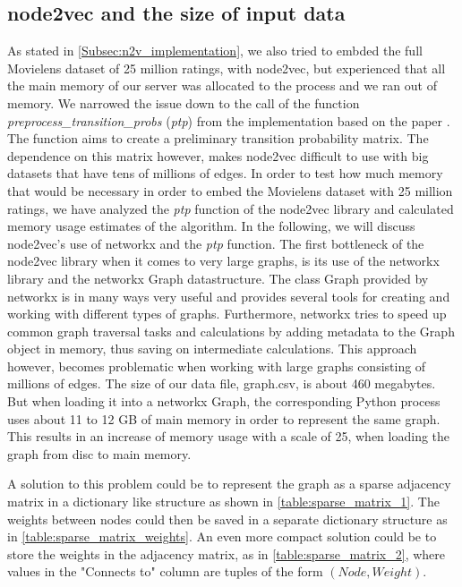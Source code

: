 \subsection{node2vec and the size of input data}\label{AP:N2V}

As stated in \autoref{Subsec:n2v_implementation}, we also tried to embded the full Movielens dataset of 25 million ratings, with node2vec, but experienced that all the main memory of our server was allocated to the process and we ran out of memory. We narrowed the issue down to the call of the function  \textit{preprocess\_transition\_probs} (\textit{ptp}) from the implementation based on the paper \cite{Node2vec}.
The function aims to create a preliminary transition probability matrix. The dependence on this matrix however, makes node2vec difficult to use with big datasets that have tens of millions of edges.
In order to test how much memory that would be necessary in order to embed the Movielens dataset with 25 million ratings, we have analyzed the \textit{ptp} function of the node2vec library and calculated memory usage estimates of the algorithm.
In the following, we will discuss node2vec's use of networkx and the \textit{ptp} function.
The first bottleneck of the node2vec library when it comes to very large graphs, is its use of the networkx library and the networkx Graph datastructure.
The class Graph provided by networkx is in many ways very useful and provides several tools for creating and working with different types of graphs. Furthermore, networkx tries to speed up common graph traversal tasks and calculations by adding metadata to the Graph object in memory, thus saving on intermediate calculations.
This approach however, becomes problematic when working with large graphs consisting of millions of edges.
The size of our data file, graph.csv, is about 460 megabytes. But when loading it into a networkx Graph, the corresponding Python process uses about 11 to 12 GB of main memory in order to represent the same graph.
This results in an increase of memory usage with a scale of 25, when loading the graph from disc to main memory.

A solution to this problem could be to represent the graph as a sparse adjacency matrix in a dictionary like structure as shown in \autoref{table:sparse_matrix_1}.
The weights between nodes could then be saved in a separate dictionary structure as in \autoref{table:sparse_matrix_weights}.
An even more compact solution could be to store the weights in the adjacency matrix, as in \autoref{table:sparse_matrix_2}, where values in the "Connects to" column are tuples of the form $(Node, Weight)$.

